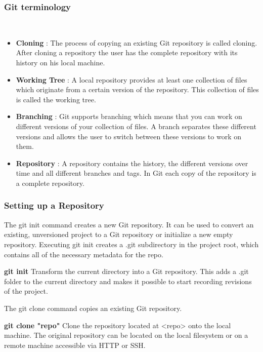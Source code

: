 \documentclass{beamer}
\begin{document}
\begin{frame}
\frametitle{Git terminology}\
\begin{itemize}
	    \item \textbf{Cloning} : The process of copying an existing Git repository is called cloning. After cloning a repository the user has the complete repository with its history on his local machine. 
	    \item \textbf{Working Tree} : A local repository provides at least one collection of files which originate from a certain version of the repository. This collection of files is called the working tree.
	    \item \textbf{Branching} : Git supports branching which means that you can work on different versions of your collection of files. A branch separates these different versions and allows the user to switch between these versions to work on them.
	    \item \textbf{Repository} : A repository contains the history, the different versions over time and all different branches and tags. In Git each copy of the repository is a complete repository.
	\end{itemize}

\end{frame}


\begin{frame}
\frametitle{Setting up a Repository}

	    The git init command creates a new Git repository. It can be used to convert an existing, unversioned project to a Git repository or initialize a new empty repository.  Executing git init creates a .git subdirectory in the project root, which contains all of the necessary metadata for the repo. 
		
		\textbf{git init}
	    Transform the current directory into a Git repository. This adds a .git folder to the current directory and makes it possible to start recording revisions of the project.
		
	
	    The git clone command copies an existing Git repository. 
	    
	    \textbf{git clone "repo"}
		Clone the repository located at <repo> onto the local machine. The original repository can be located on the local filesystem or on a remote machine accessible via HTTP or SSH.
\end{frame}
\end{document}
